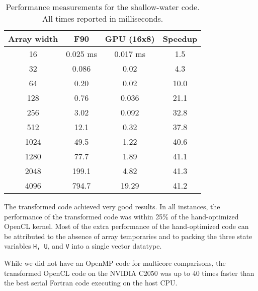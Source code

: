\begin{table}
\begin{center}
	\begin{tabular}{|c|c|c|c|}
	\hline Array width & F90 & GPU (16x8) & Speedup \\ \hline\hline
	16   & 0.025 ms & 0.017 ms & 1.5  \\ \hline
	32   & 0.086    & 0.02     & 4.3  \\ \hline
	64   & 0.20     & 0.02     & 10.0 \\ \hline
	128  & 0.76     & 0.036    & 21.1 \\ \hline
	256  & 3.02     & 0.092    & 32.8 \\ \hline
	512  & 12.1     & 0.32     & 37.8 \\ \hline
	1024 & 49.5     & 1.22     & 40.6 \\ \hline
	1280 & 77.7     & 1.89     & 41.1 \\ \hline
	2048 & 199.1    &  4.82    & 41.3 \\ \hline
	4096 & 794.7    & 19.29    & 41.2 \\ \hline
	\end{tabular}
\end{center}
\caption{Performance measurements for the shallow-water code.  All times reported in milliseconds.}
\label{table:performance}
\end{table}

The transformed code achieved very good results.  In all instances, the
performance of the transformed code was within 25\% of the hand-optimized OpenCL
kernel.  Most of the extra performance of the hand-optimized code can be
attributed to the absence of array temporaries and to packing the three state
variables {\tt H, U}, and {\tt V} into a single vector datatype.

While we did not have an OpenMP code for multicore comparisons, the transformed
OpenCL code on the NVIDIA C2050 was up to 40 times faster than the best serial
Fortran code executing on the host CPU.


